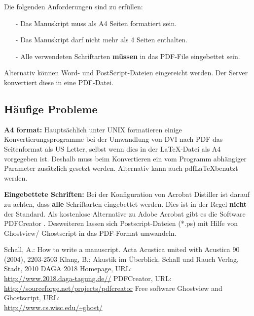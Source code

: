 \documentclass[a4paper, 10pt, twocolumn]{article}
\begin{document}
Die folgenden Anforderungen sind zu erfüllen:
\begin{itemize}
    \item[-] Das Manuskript muss als A4 Seiten formatiert sein.
    \item[-] Das Manuskript darf nicht mehr als 4 Seiten enthalten.
    \item[-] Alle verwendeten Schriftarten \textbf{müssen} in das PDF-File eingebettet sein.
\end{itemize}
Alternativ können Word- und PostScript-Dateien eingereicht werden. Der Server konvertiert diese in eine PDF-Datei.
\subsection*{Häufige Probleme}
\textbf{A4 format:} Hauptsächlich unter UNIX formatieren einige Konvertierungsprogramme bei der Umwandlung von DVI nach PDF das Seitenformat als US Letter, selbst wenn dies in der \LaTeX-Datei als A4 vorgegeben ist. Deshalb muss beim Konvertieren ein vom Programm abhängiger Parameter zusätzlich gesetzt werden.
Alternativ kann auch pdf\LaTeX benutzt werden.

\textbf{Eingebettete Schriften:} Bei der Konfiguration von Acrobat Distiller ist darauf zu achten, dass \textbf{alle} Schriftarten eingebettet werden. Dies ist in der Regel \textbf{nicht} der Standard. Als kostenlose Alternative zu Adobe Acrobat gibt es die Software PDFCreator \cite{PDFCreator}. Desweiteren lassen sich Postscript-Dateien (*.ps) mit Hilfe von Ghostview/ Ghostscript \cite{Ghostware} in das PDF-Format umwandeln.
\begin{thebibliography}{5}
Schall, A.: How to write a manuscript. Acta Acustica united with
Acustica 90 (2004), 2203-2503
Klang, B.: Akustik im Überblick. Schall und Rauch Verlag, Stadt,
2010
DAGA 2018 Homepage, URL:\\
\url{http://www.2018.daga-tagung.de//}
PDFCreator, URL:\\
\url{http://sourceforge.net/projects/pdfcreator}
Free software Ghostview and Ghostscript, URL:\\
\url{http://www.cs.wisc.edu/~ghost/}
\end{thebibliography}
\end{document}
